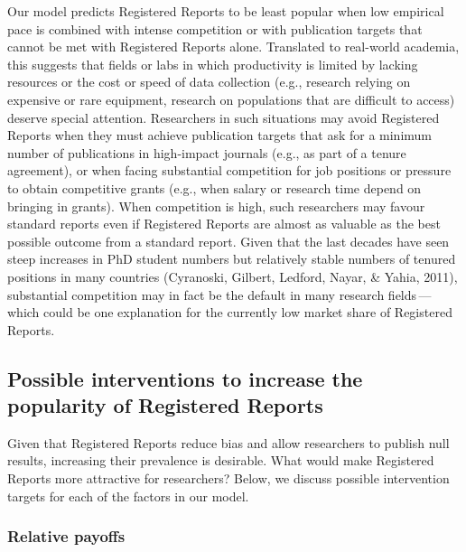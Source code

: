 \documentclass[
  british,
  a4paper,
  ,man,floatsintext]{apa6}
\begin{document}
Our model predicts Registered Reports to be least popular when low empirical pace is combined with intense competition or with publication targets that cannot be met with Registered Reports alone.
Translated to real-world academia, this suggests that fields or labs in which productivity is limited by lacking resources or the cost or speed of data collection (e.g., research relying on expensive or rare equipment, research on populations that are difficult to access) deserve special attention.
Researchers in such situations may avoid Registered Reports when they must achieve publication targets that ask for a minimum number of publications in high-impact journals (e.g., as part of a tenure agreement), or when facing substantial competition for job positions or pressure to obtain competitive grants (e.g., when salary or research time depend on bringing in grants).
When competition is high, such researchers may favour standard reports even if Registered Reports are almost as valuable as the best possible outcome from a standard report.
Given that the last decades have seen steep increases in PhD student numbers but relatively stable numbers of tenured positions in many countries (Cyranoski, Gilbert, Ledford, Nayar, \& Yahia, 2011), substantial competition may in fact be the default in many research fields\(\,\)---\(\,\)which could be one explanation for the currently low market share of Registered Reports.

\par\vspace{.8\baselineskip}

\subsection{Possible interventions to increase the popularity of Registered Reports}\label{possible-interventions-to-increase-the-popularity-of-registered-reports}

Given that Registered Reports reduce bias and allow researchers to publish null results, increasing their prevalence is desirable.
What would make Registered Reports more attractive for researchers?
Below, we discuss possible intervention targets for each of the factors in our model.

\par\vspace{0.4\baselineskip}

\subsubsection{Relative payoffs}\label{relative-payoffs}
\end{document}
